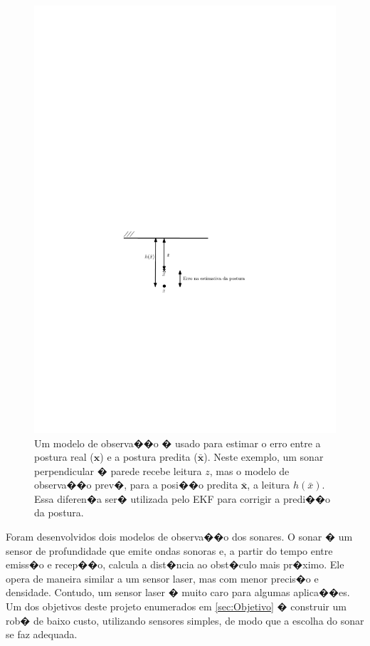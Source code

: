 \begin{figure}[b]
	\centering
		\includegraphics{imagens/sonar/exemplo_modelo.pdf}
			\caption{Um modelo de observa��o � usado para estimar o erro entre a postura real ($\textbf{x}$) e a postura predita ($\bar{\textbf{x}}$). Neste exemplo, um sonar perpendicular � parede recebe leitura $z$, mas o modelo de observa��o prev�, para a posi��o predita $\bar{\textbf{x}}$, a leitura $h(\bar{x})$. Essa diferen�a ser� utilizada pelo EKF para corrigir a predi��o da postura.}
	\label{fig:exemplo_modelo}
\end{figure}

Foram desenvolvidos dois modelos de observa��o dos sonares. O sonar � um sensor de profundidade que emite ondas sonoras e, a partir do tempo entre emiss�o e recep��o, calcula a dist�ncia ao obst�culo mais pr�ximo. Ele opera de maneira similar a um sensor laser, mas com menor precis�o e densidade. Contudo, um sensor laser � muito caro para algumas aplica��es. Um dos objetivos deste projeto enumerados em \ref{sec:Objetivo} � construir um rob� de baixo custo, utilizando sensores simples, de modo que a escolha do sonar se faz adequada.

